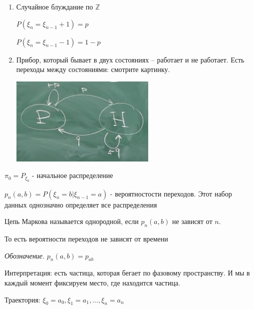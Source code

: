 \begin{example}
    \begin{enumerate}
        \item {
            Случайное блуждание по $\mathbb{Z}$

            $P(\xi_n = \xi_{n-1} + 1) = p$
            
            $P(\xi_n = \xi_{n-1} - 1) = 1 - p$
        }
        \item {
            Прибор, который бывает в двух состояниях -- работает и не работает. Есть переходы между состояниями: смотрите картинку.

            \begin{center}
                \includegraphics[width=7cm]{assets/04-descrete-random-process/probability-example-work-not-work.png}
            \end{center}


        }
    \end{enumerate}
    \begin{remark}
        $\pi_0 = P_{\xi_0}$ - начальное распределение

        $p_n (a, b) = P(\xi_n = b | \xi_{n - 1} = a)$ - вероятностости переходов. Этот набор данных однозначно определяет все распределения
    \end{remark}
\end{example}

\begin{definition}
    Цепь Маркова называется однородной, если $p_n (a, b)$ не зависят от $n$. 

    То есть вероятности переходов не зависят от времени

    \textit{Обозначение.} $p_n (a, b) = p_{ab}$
\end{definition}

\begin{remark}
    Интерпретация: есть частица, которая бегает по фазовому пространству. И мы в каждый момент фиксируем место, где находится частица.
\end{remark}

\begin{definition}
    Траектория: $\xi_0 = a_0, \xi_1 = a_1, \ldots, \xi_n = a_n$
\end{definition}

